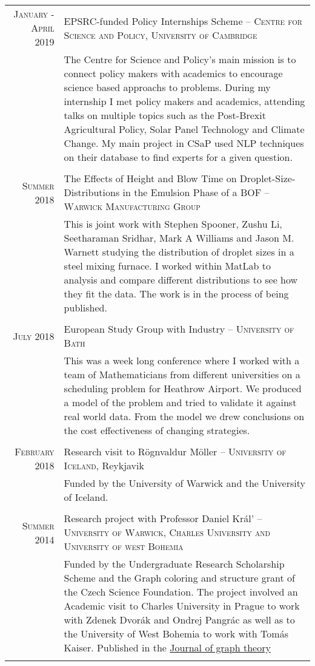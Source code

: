 \documentclass[a4paper,10pt]{article}
\begin{document}
\begin{tabular}{r|p{14 cm}}
\textsc{January - April 2019} & EPSRC-funded Policy Internships Scheme -- \textsc{Centre for Science and Policy, University of Cambridge}\\&\footnotesize{The Centre for Science and Policy's main mission is to connect policy makers with academics to encourage science based approachs to problems. During my internship I met policy makers and academics, attending talks on multiple topics such as the Post-Brexit Agricultural Policy, Solar Panel Technology and Climate Change. My main project in CSaP used NLP techniques on their database to find experts for a given question.}\\\multicolumn{2}{c}{} \\
\textsc{Summer 2018} & The Effects of Height and Blow Time on Droplet-Size-Distributions in the Emulsion Phase of a BOF -- \textsc{Warwick Manufacturing Group}\\&\footnotesize{This is joint work with Stephen Spooner, Zushu Li, Seetharaman Sridhar, Mark A Williams and Jason M. Warnett studying the distribution of droplet sizes in a steel mixing furnace. I worked within MatLab to analysis and compare different distributions to see how they fit the data. The work is in the process of being published.}\\\multicolumn{2}{c}{} \\
\textsc{July 2018} & European Study Group with Industry -- \textsc{University of Bath}\\&\footnotesize{This was a week long conference where I worked with a team of Mathematicians from different universities on a scheduling problem for Heathrow Airport. We produced a model of the problem and tried to validate it against real world data. From the model we drew conclusions on the cost effectiveness of changing strategies.}\\\multicolumn{2}{c}{} \\	
\textsc{February 2018} & Research visit to R\"{o}gnvaldur M\"{o}ller -- \textsc{University of Iceland}, Reykjavik\\&\footnotesize{Funded by the University of Warwick and the University of Iceland.}\\\multicolumn{2}{c}{} \\
\textsc{Summer 2014} & Research project with Professor Daniel Kr\'{a}l' -- \textsc{University of Warwick, Charles University and University of west Bohemia}\\&\footnotesize{Funded by the Undergraduate Research Scholarship Scheme and the Graph coloring and structure grant of the Czech Science Foundation. The project involved an Academic visit to Charles University in Prague to work with Zdenek Dvorák and Ondrej Pangrác as well as to the University of West Bohemia to work with Tomás Kaiser. Published in the \href{http://onlinelibrary.wiley.com/doi/10.1002/jgt.22002/abstract}{Journal of graph theory}}\\\multicolumn{2}{c}{} \\

\end{tabular}
\end{document}
